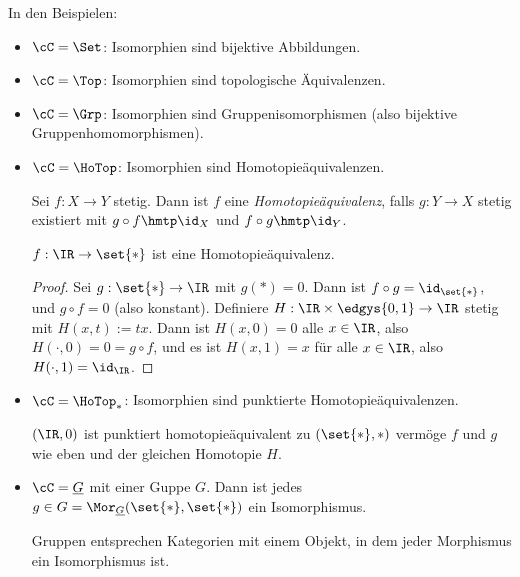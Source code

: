 \documentclass[language=ngerman]{TemplateLecture} %
\begin{document}
In den Beispielen:
\begin{itemize}
    \item $\cC = \Set$: Isomorphien sind bijektive Abbildungen.
    \item $\cC = \Top$: Isomorphien sind topologische Äquivalenzen.
    \item $\cC = \Grp$: Isomorphien sind Gruppenisomorphismen (also bijektive Gruppenhomomorphismen).
    \item $\cC = \HoTop$: Isomorphien sind Homotopieäquivalenzen.
    
        Sei $f: X \to Y$ stetig. Dann ist $f$ eine \emph{Homotopieäquivalenz}, falls $g: Y \to X$ stetig existiert mit $g \circ f \hmtp \id_X$ und $f \circ g \hmtp \id_Y$.

        \begin{example}
            $f: \IR \to \set{*}$ ist eine Homotopieäquivalenz.
        \end{example}
        \begin{proof}
            Sei $g : \set{*} \to \IR$ mit $g(*) = 0$. Dann ist $f \circ g = \id_{\set{*}}$, und $g \circ f = 0$ (also konstant). Definiere $H: \IR \times \edgys{0,1} \to \IR$ stetig mit $H(x,t) := tx$. Dann ist $H(x,0) = 0$ alle $x \in \IR$, also $H(\cdot, 0) = 0 = g \circ f$, und es ist $H(x, 1) = x$ für alle $x \in \IR$, also $H(\cdot, 1) = \id_\IR$.
        \end{proof}
    \item $\cC = \HoTop_*$: Isomorphien sind punktierte Homotopieäquivalenzen.
    \begin{remark}
        $(\IR, 0)$ ist punktiert homotopieäquivalent zu $(\set{*},*)$ vermöge $f$ und $g$ wie eben und der gleichen Homotopie $H$.
    \end{remark}
    \item $\cC = \underline{G}$ mit einer Guppe $G$. Dann ist jedes $g \in G = \Mor_{\underline{G}}(\set{*},\set{*})$ ein Isomorphismus.
    \begin{remark}
        Gruppen entsprechen Kategorien mit einem Objekt, in dem jeder Morphismus ein Isomorphismus ist.
    \end{remark}
\end{itemize}
\end{document}
